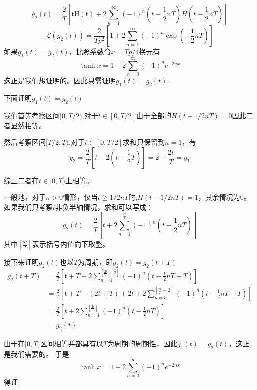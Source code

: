 \documentclass[a4paper]{ctexart}
\begin{document}
\subsection{}
$$
    g_2\left( t \right) =\frac{2}{T}\left[ \text{tH}\left( \text{t} \right) +2\sum_{n=1}^{\infty}{\left( -1 \right)}^n\left( t-\frac{1}{2}nT \right) H\left( t-\frac{1}{2}nT \right) \right]
$$
$$
    \mathcal{L}\left( g_2\left( t \right) \right) =\frac{2}{Tp^2}\left[ 1+2\sum_{n=1}^{\infty}{\left( -1 \right)}^n\exp \left( -\frac{1}{2}nT \right) \right]
$$
如果$g_1(t)=g_2(t)$，比照系数令$x=Tp/4$换元有
$$
    \tanh x=1+2 \sum_{n=0}^{\infty}(-1)^{n} e^{-2 n x}
$$
这正是我们想证明的。因此只需证明$g_1(t)=g_2(t)$.

下面证明$g_1(t)=g_2(t)$

我们首先考察区间$[0,T/2)$,对于$t\in [0,T/2]$由于全部的$H(t-1/2nT)=0$因此二者显然相等。

然后考察区间$[T/2,T)$,对于$t\in [0,T/2]$求和只保留到$n=1$，有
$$
    g_2=\frac{2}{T}\left[ t-2\left( t-\frac{1}{2}T \right) \right] =2-\frac{2t}{T}=g_1
$$

综上二者在$t\in [0,T)$上相等。

一般地，对于$n>0$情形，仅当$t\geq 1/2nT$时,$H(t-1/2nT)=1$，其余情况为0。如果我们只考察$t$非负半轴情况，求和可以写成：
$$
    g_2\left( t \right) =\frac{2}{T}\left[ t +2\sum_{n=1}^{\left[ \frac{2t}{T} \right]}{\left( -1 \right)}^n\left( t-\frac{1}{2}nT \right) \right]
$$
其中$\left[ \frac{2t}{T} \right]$表示括号内值向下取整。

接下来证明$g_2(t)$也以$T$为周期，即$g_2(t)=g_2(t+T)$
$$
    \begin{aligned}
        g_2\left( t+T \right)
         & =\frac{2}{T}\left[ \text{t}+T+2\sum_{n=1}^{\left[ \frac{2t}{T}+2 \right]}{\left( -1 \right)}^n\left( t-\frac{1}{2}nT+T \right) \right]                         \\
         & =\frac{2}{T}\left[ \text{t}+T-\left( 2t+T \right) +2t+2\sum_{n=3}^{\left[ \frac{2t}{T}+2 \right]}{\left( -1 \right)}^n\left( t-\frac{1}{2}nT+T \right) \right] \\
         & =\frac{2}{T}\left[ t+2\sum_{n=1}^{\left[ \frac{2t}{T} \right]}{\left( -1 \right)}^n\left( t-\frac{1}{2}nT \right) \right]                                      \\
         & =g_2\left( t \right)
    \end{aligned}
$$

由于在$[0,T)$区间相等并都具有以$T$为周期的周期性，因此$g_1(t)=g_2(t)$，这正是我们需要的。
于是
$$
    \tanh x=1+2 \sum_{n=0}^{\infty}(-1)^{n} e^{-2 n x}
$$
得证
\end{document}
